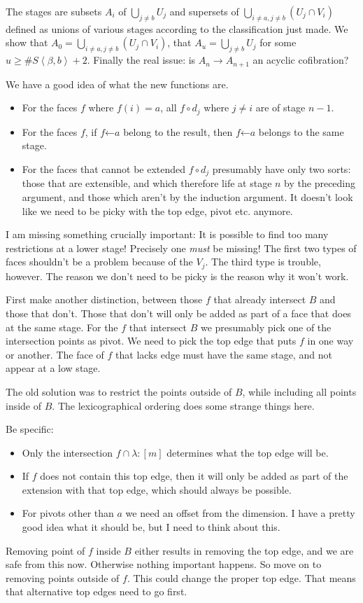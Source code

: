 \documentclass{tac}
\newcommand\of{:}
\newcommand\tuplet[1]{\left\langle #1 \right\rangle}
\begin{document}
The stages are subsets $A_i$ of $\bigcup_{j\neq b}U_j$ and supersets of $\bigcup_{i\neq a,j\neq b}(U_j\cap V_i)$ defined as unions of various stages according to the classification just made. We show that $A_0 = \bigcup_{i\neq a,j\neq b}(U_j\cap V_i)$, that $A_u = \bigcup_{j\neq b}U_j$ for some $u\geq\#S\tuplet{\beta,b}+2$. Finally the real issue: is $A_n \to A_{n+1}$ an acyclic cofibration?

We have a good idea of what the new functions are. 
\begin{itemize}
\item For the faces $f$ where $f(i) = a$, all $f\circ d_j$ where $j\neq i$ are of stage $n - 1$.
\item For the faces $f$, if $f \mathord\leftarrow a$ belong to the result, then $f\mathord\leftarrow a$ belongs to the same stage.
\item For the faces that cannot be extended $f\circ d_j$ presumably have only two sorts: those that are extensible, and which therefore life at stage $n$ by the preceding argument, and those which aren't by the induction argument. It doesn't look like we need to be picky with the top edge, pivot etc. anymore.
\end{itemize}

I am missing something crucially important:
It is possible to find too many restrictions at a lower stage!
Precisely one \emph{must} be missing! The first two types of faces shouldn't be a problem because of the $V_j$.
The third type is trouble, however. The reason we don't need to be picky
is the reason why it won't work.

First make another distinction, between those $f$ that already intersect $B$ and those that don't. Those that don't will only be added as part of a face that does at the same stage. For the $f$ that intersect $B$ we presumably pick one of the intersection points as pivot.
We need to pick the top edge that puts $f$ in one way or another. The face of $f$ that lacks edge must have the same stage, and not appear at a low stage.

The old solution was to restrict the points outside of $B$, while including all points inside of $B$. The lexicographical ordering does some strange things here.

Be specific:
\begin{itemize} 
\item Only the intersection $f \cap \lambda\of [m]$ determines what the top edge will be.
\item If $f$ does not contain this top edge, then it will only be added as part of the extension with that top edge, which should always be possible.
\item For pivots other than $a$ we need an offset from the dimension. I have a pretty good idea what it should be, but I need to think about this.
\end{itemize}
Removing point of $f$ inside $B$ either results in removing the top edge, and we are safe from this now. Otherwise nothing important happens. So move on to removing points outside of $f$. This could change the proper top edge. That means that alternative top edges need to go first.
\end{document}
